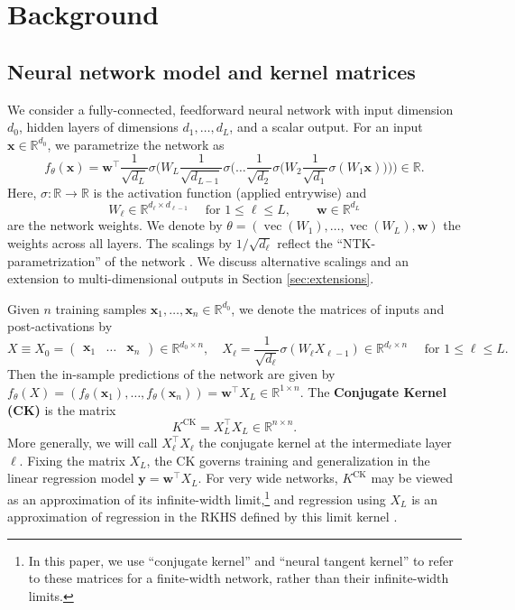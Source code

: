 \documentclass{article}
\theoremstyle{definition}
\newcommand{\R}{\mathbb{R}}
\newcommand{\CK}{\text{CK}}
\newcommand{\x}{\mathbf{x}}
\newcommand{\y}{\mathbf{y}}
\newcommand{\w}{\mathbf{w}}
\newcommand{\1}{\mathbf{1}}
\renewcommand{\vec}{\operatorname{vec}}
\begin{document}

\section{Background}\label{sec:background}

\subsection{Neural network model and kernel matrices}\label{sec:model}

We consider a fully-connected, feedforward neural network with input dimension
$d_0$, hidden layers of dimensions $d_1,\ldots,d_L$, and a scalar output.
For an input $\x \in \R^{d_0}$, we parametrize the network as
\begin{equation}\label{eq:NNfunc}
f_\theta(\x)=\w^\top \frac{1}{\sqrt{d_L}} \sigma\bigg(
W_L \frac{1}{\sqrt{d_{L-1}}}\sigma \Big(\ldots
\frac{1}{\sqrt{d_2}}\sigma\Big(W_2\frac{1}{\sqrt{d_1}} \sigma(W_1 \x)
\Big)\Big)\bigg) \in \R.
\end{equation}
Here, $\sigma:\R \to \R$ is the activation function (applied entrywise) and
\[W_\ell \in \R^{d_\ell \times d_{\ell-1}} \quad
\text{ for } 1 \leq \ell \leq L, \qquad
\w \in \R^{d_L}\]
are the network weights. We denote by $\theta=(\vec(W_1),\ldots,\vec(W_L),\w)$ the weights across all layers. The scalings by
$1/\sqrt{d_\ell}$ reflect the ``NTK-parametrization'' of the network \cite{jacot2018neural}. We discuss
alternative scalings and an extension to 
multi-dimensional outputs in Section \ref{sec:extensions}.

Given $n$ training samples $\x_1,\ldots,\x_n \in \R^{d_0}$, we
denote the matrices of inputs and post-activations by
\[X \equiv X_0
=\begin{pmatrix} \x_1 & \dots & \x_n \end{pmatrix} \in \R^{d_0 \times n},
\quad X_\ell=\frac{1}{\sqrt{d_\ell}}
\sigma\left(W_\ell X_{\ell-1}\right) \in
\R^{d_\ell \times n}\quad \text{ for } 1\leq\ell\leq L.\]
Then the in-sample predictions of the network are given by
$f_\theta(X)=(f_\theta(\x_1),\ldots,f_\theta(\x_n))
=\w^\top X_L \in \R^{1 \times n}$. 
The {\bf Conjugate Kernel (CK)} is the matrix
\[K^\CK=X_L^\top X_L \in \R^{n \times n}.\]
More generally, we will call $X_\ell^\top X_\ell$ the conjugate kernel at the
intermediate layer $\ell$. Fixing the matrix $X_L$, the CK governs
training 
and generalization in the linear regression model $\y=\w^\top X_L$. For very
wide networks, $K^\CK$ may be viewed as an approximation of its infinite-width
limit,\footnote{In this paper, we
use ``conjugate kernel'' and ``neural tangent kernel'' to refer to these
matrices for a finite-width network, rather than their infinite-width limits.}
and regression using $X_L$ is an approximation of regression in the RKHS
defined by this limit kernel \cite{rahimi2008random}.
\end{document}

